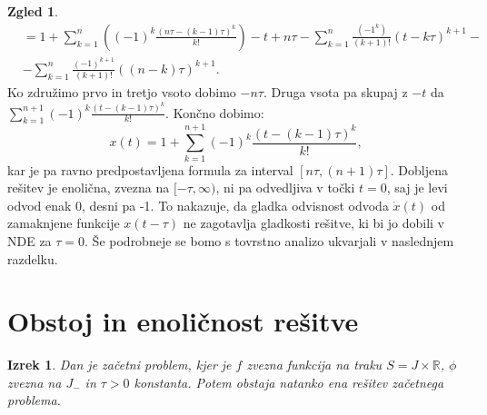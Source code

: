 \documentclass[12pt,a4paper]{amsart}
\theoremstyle{definition} %
\newtheorem{zgled}[definicija]{Zgled}
\theoremstyle{plain} %
\newtheorem{izrek}[definicija]{Izrek}
\newcommand{\R}{\mathbb R}
\begin{document}
\begin{zgled}
\begin{equation*}
\begin{split}
        & = 1 + \sum_{k=1}^{n}\left((-1)^k\frac{(n\tau-(k-1)\tau)^k}{k!}\right)- t + n\tau - \sum_{k=1}^{n}\frac{(-1^k)}{(k+1)!}
        (t-k\tau)^{k+1} - \\
        &- \sum_{k=1}^{n}\frac{(-1)^{k+1}}{(k+1)!}((n-k)\tau)^{k+1}.
    \end{split}      
    \end{equation*}
    Ko združimo prvo in tretjo vsoto dobimo $-n\tau$. Druga vsota pa skupaj z $-t$ da
     $\sum_{k=1}^{n+1}(-1)^{k}\frac{(t-(k-1)\tau)^k}{k!}$. Končno dobimo:
     \[x(t) = 1+ \sum_{k=1}^{n+1}(-1)^{k}\frac{(t-(k-1)\tau)^k}{k!},\]
    kar je pa ravno predpostavljena formula za interval $[n\tau, (n+1)\tau].$
    Dobljena rešitev je enolična, zvezna na $[-\tau,\infty)$, ni pa odvedljiva v točki $t=0$, saj je 
    levi odvod enak 0, desni pa -1. To nakazuje, da gladka odvisnost odvoda $\dot{x}(t)$ od zamaknjene
    funkcije $x(t-\tau)$
    ne zagotavlja gladkosti rešitve, ki bi jo dobili
    v NDE za $\tau=0$. Še podrobneje se bomo s tovrstno analizo ukvarjali v naslednjem razdelku.
\end{zgled}



\section{Obstoj in enoličnost rešitve}

\begin{izrek}
    Dan je začetni problem, kjer je $f$ zvezna funkcija na traku $S=J \times \R$, $\phi$ zvezna na $J_{-}$ in $\tau >0$
    konstanta. Potem obstaja natanko ena rešitev začetnega problema.
\end{izrek}
\end{document}
